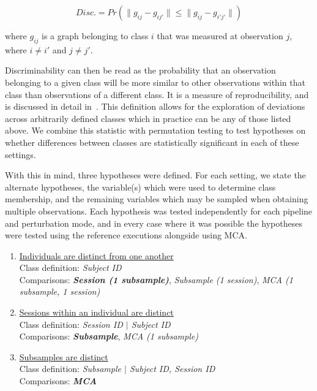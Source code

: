 \documentclass[fleqn,10pt]{SelfArx} %
\begin{document}
\begin{equation}
Disc. = Pr(\lVert g_{ij} - g_{ij'} \rVert \leq \lVert g_{ij} - g_{i'j'} \rVert)
\label{eq:sigdig}
\end{equation}

where $g_{ij}$ is a graph belonging to class $i$ that was measured at observation $j$, where $i \neq i'$ and
$j \neq j'$.

Discriminability can then be read as the probability that an observation belonging to a given class will be more
similar to other observations within that class than observations of a different class. It is a measure of
reproducibility, and is discussed in detail in~\cite{bridgeford2020elim}. This definition allows for the exploration of
deviations across arbitrarily defined classes which in practice can be any of those listed above. We combine this
statistic with permutation testing to test hypotheses on whether differences between classes are statistically
significant in each of these settings.

With this in mind, three hypotheses were defined. For each setting, we state the alternate hypotheses, the variable(s)
which were used to determine class membership, and the remaining variables which may be sampled when obtaining multiple
observations. Each hypothesis was tested independently for each pipeline and perturbation mode, and in every case where
it was possible the hypotheses were tested using the reference executions alongside using MCA.

\begin{enumerate}[label=$H_{A\arabic*}$:]
\item \underline{Individuals are distinct from one another}\\
Class definition: \textit{Subject ID}\\
Comparisons: \textbf{\textit{Session (1 subsample)}}, \textit{Subsample (1 session)},
\textit{MCA (1 subsample, 1 session)}
\item \underline{Sessions within an individual are distinct}\\
Class definition: \textit{Session ID $\vert$ Subject ID}\\
Comparisons: \textbf{\textit{Subsample}}, \textit{MCA (1 subsample)}
\item \underline{Subsamples are distinct}\\
Class definition: \textit{Subsample $\vert$ Subject ID, Session ID}\\
Comparisons: \textbf{\textit{MCA}}
\end{enumerate}
\end{document}

